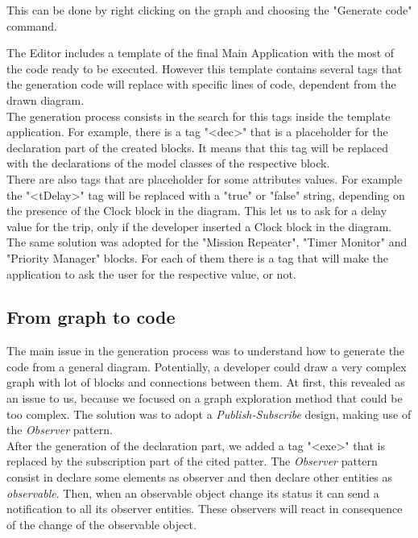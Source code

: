 This can be done by right clicking on the graph and choosing the "Generate code" command.

The Editor includes a template of the final Main Application with the most of the code ready to be executed. However this template contains several tags that the generation code will replace with specific lines of code, dependent from the drawn diagram.
\\

The generation process consists in the search for this tags inside the template application. For example, there is a tag "<dec>" that is a placeholder for the declaration part of the created blocks. It means that this tag will be replaced with the declarations of the model classes of the respective block.
\\

There are also tags that are placeholder for some attributes values. For example the "<tDelay>" tag will be replaced with a "true" or "false" string, depending on the presence of the Clock block in the diagram. This let us to ask for a delay value for the trip, only if the developer inserted a Clock block in the diagram. The same solution was adopted for the "Mission Repeater", "Timer Monitor" and "Priority Manager" blocks.
For each of them there is a tag that will make the application to ask the user for the respective value, or not.
\\

\subsection{From graph to code}

The main issue in the generation process was to understand how to generate the code from a general diagram. Potentially, a developer could draw a very complex graph with lot of blocks and connections between them. At first, this revealed as an issue to us, because we focused on a graph exploration method that could be too complex. The solution was to adopt a \textit{Publish-Subscribe} design, making use of the \textit{Observer} pattern.
\\

After the generation of the declaration part, we added a tag "<exe>" that is replaced by the subscription part of the cited patter. The \textit{Observer} pattern consist in declare some elements as observer and then declare other entities as \textit{observable}. Then, when an observable object change its status it can send a notification to all its observer entities. These observers will react in consequence of the change of the observable object.
\\

